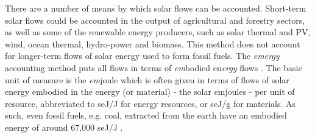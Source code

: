 \documentclass[authoryear,preprint,review,12pt]{elsarticle}
\begin{document}
There are a number of means by which solar flows can be accounted. Short-term solar flows could be accounted in the output of agricultural and forestry sectors, as well as some of the renewable energy producers, such as solar thermal and PV, wind, ocean thermal, hydro-power and biomass. This method does not account for longer-term flows of solar energy used to form fossil fuels. The \emph{emergy} accounting method puts all flows in terms of \emph{em}bodied en\emph{ergy} flows \cite{Odum1975, Odum1996}. The basic unit of measure is the \emph{em}joule which is often given in terms of flows of solar energy embodied in the energy (or material) - the solar emjoules - per unit of resource, abbreviated to seJ/J for energy resources, or seJ/g for materials. As such, even fossil fuels, e.g. coal, extracted from the earth have an embodied energy of around 67,000 seJ/J \cite{Brown2004}. 
\end{document}
